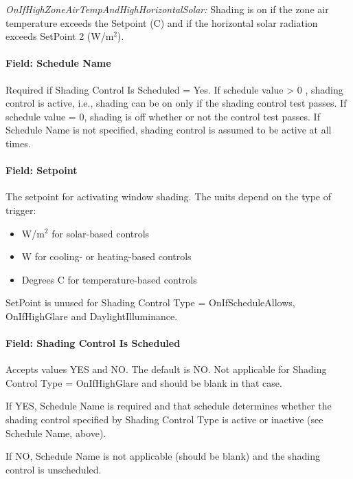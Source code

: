 \emph{OnIfHighZoneAirTempAndHighHorizontalSolar:} Shading is on if the zone air temperature exceeds the Setpoint (C) and if the horizontal solar radiation exceeds SetPoint 2 (W/m\(^{2}\)).

\paragraph{Field: Schedule Name}\label{field-schedule-name-007}

Required if Shading Control Is Scheduled = Yes. If schedule value \textgreater{} 0 , shading control is active, i.e., shading can be on only if the shading control test passes. If schedule value = 0, shading is off whether or not the control test passes. If Schedule Name is not specified, shading control is assumed to be active at all times.

\paragraph{Field: Setpoint}\label{field-setpoint}

The setpoint for activating window shading. The units depend on the type of trigger:

\begin{itemize}
\item
  W/m\(^{2}\) for solar-based controls
\item
  W for cooling- or heating-based controls
\item
  Degrees C for temperature-based controls
\end{itemize}

SetPoint is unused for Shading Control Type = OnIfScheduleAllows, OnIfHighGlare and DaylightIlluminance.

\paragraph{Field: Shading Control Is Scheduled}\label{field-shading-control-is-scheduled}

Accepts values YES and NO. The default is NO. Not applicable for Shading Control Type = OnIfHighGlare and should be blank in that case.

If YES, Schedule Name is required and that schedule determines whether the shading control specified by Shading Control Type is active or inactive (see Schedule Name, above).

If NO, Schedule Name is not applicable (should be blank) and the shading control is unscheduled.

